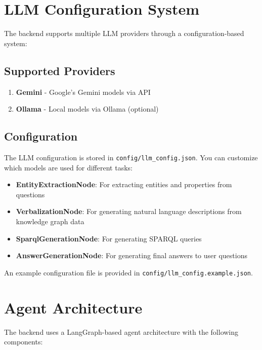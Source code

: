 \section*{LLM Configuration System}

The backend supports multiple LLM providers through a configuration-based system:

\subsection*{Supported Providers}

\begin{enumerate}
    \item \textbf{Gemini} - Google's Gemini models via API
    \item \textbf{Ollama} - Local models via Ollama (optional)
\end{enumerate}

\subsection*{Configuration}

The LLM configuration is stored in \texttt{config/llm\_config.json}. You can customize which models are used for different tasks:

\begin{itemize}
    \item \textbf{EntityExtractionNode}: For extracting entities and properties from questions
    \item \textbf{VerbalizationNode}: For generating natural language descriptions from knowledge graph data
    \item \textbf{SparqlGenerationNode}: For generating SPARQL queries
    \item \textbf{AnswerGenerationNode}: For generating final answers to user questions
\end{itemize}

An example configuration file is provided in \texttt{config/llm\_config.example.json}.

\section*{Agent Architecture}

The backend uses a LangGraph-based agent architecture with the following components:

